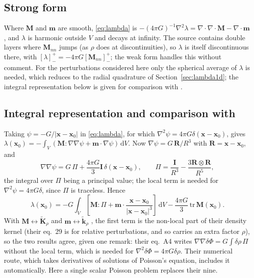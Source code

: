 \documentclass[11pt,a4paper]{article}
\newcommand{\bx}{\mathbf{x}}
\newcommand{\bM}{\mathbf{M}}
\newcommand{\vm}{\mathbf{m}}
\newcommand{\bI}{\mathbf{I}}
\newcommand{\jump}[1]{\left[#1\right]^+_-}
\newcommand{\dd}{\,\mathrm{d}}
\theoremstyle{remark}
\begin{document}
\subsection{Strong form}

Where $\bM$ and $\vm$ are smooth, \eqref{eq:lambda} is
$-(4\pi G)^{-1}\nabla^2\lambda = \nabla\cdot\nabla\cdot\bM - \nabla\cdot\vm$,
and $\lambda$ is harmonic outside $V$ and decays at infinity. The source
contains double layers where $\bM_{nn}$ jumps (as $\rho$ does at
discontinuities), so $\lambda$ is itself discontinuous there, with
$\jump{\lambda} = -4\pi G\jump{\bM_{nn}}$; the weak form handles this
without comment. For the perturbations considered here only the spherical
average of $\lambda$ is needed, which reduces to the radial quadrature of
Section~\ref{sec:lambda1d}; the integral representation below is given for
comparison with \citet{Eaton2026}.

\subsection{Integral representation and comparison with
\citet{Eaton2026}}

Taking $\psi = -G/|\bx-\bx_0|$ in \eqref{eq:lambda}, for which
$\nabla^2\psi = 4\pi G\delta(\bx-\bx_0)$, gives
$\lambda(\bx_0) = -\int_V(\bM:\nabla\nabla\psi + \vm\cdot\nabla\psi)\dd V$.
Now $\nabla\psi = G\,\mathbf{R}/R^3$ with $\mathbf{R}=\bx-\bx_0$, and
\begin{equation}
  \nabla\nabla\psi = G\,\Pi + \frac{4\pi G}{3}\bI\,\delta(\bx-\bx_0),
  \qquad \Pi = \frac{\bI}{R^3} - \frac{3\mathbf{R}\otimes\mathbf{R}}{R^5},
\end{equation}
the integral over $\Pi$ being a principal value; the local term is needed
for $\nabla^2\psi = 4\pi G\delta$, since $\Pi$ is traceless. Hence
\begin{equation}
  \lambda(\bx_0) = -G\int_V\left[\bM:\Pi + \vm\cdot\frac{\bx-\bx_0}
  {|\bx-\bx_0|^3}\right]\dd V - \frac{4\pi G}{3}\,\mathrm{tr}\,\bM(\bx_0).
\end{equation}
With $\bM\leftrightarrow\tilde{\mathbf{K}}_\rho$ and $\vm\leftrightarrow
\tilde{\mathbf{k}}_\rho$ \citep[][eqs~23--24]{Eaton2026}, the first term is
the non-local part of their density kernel (their eq.~29 is for relative
perturbations, and so carries an extra factor $\rho$), so the two results
agree, given one remark: their eq.~A4 writes $\nabla\nabla\delta\Phi =
G\int\delta\rho\,\Pi$ without the local term, which is needed for
$\nabla^2\delta\Phi = 4\pi G\delta\rho$. Their numerical route, which takes
derivatives of solutions of Poisson's equation, includes it automatically.
Here a single scalar Poisson problem replaces their nine.
\end{document}
